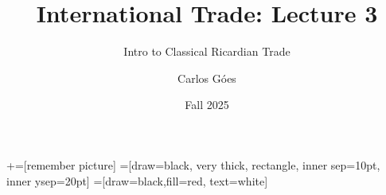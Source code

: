 \documentclass[notes,11pt, aspectratio=169, xcolor=table]{beamer}
\title[]{International Trade: Lecture 3}
\subtitle[]{Intro to Classical Ricardian Trade}
\author[Góes]
{Carlos Góes\inst{1}}
\date{Fall 2025}
\institute[GWU]{\inst{1} George Washington University }
\begin{document}
\newcommand\marktopleft[1]{%
    \tikz[overlay,remember picture] 
        \node (marker-#1-a) at (-.3em,.3em) {};%
}
\newcommand\markbottomright[2]{%
    \tikz[overlay,remember picture] 
        \node (marker-#1-b) at (0em,0em) {};%
}
+=[remember picture] 
 =[draw=black, very thick, rectangle, inner sep=10pt, inner ysep=20pt]
 =[draw=black,fill=red, text=white]















\frame{\titlepage}
\addtocounter{framenumber}{-1}



\end{document}
